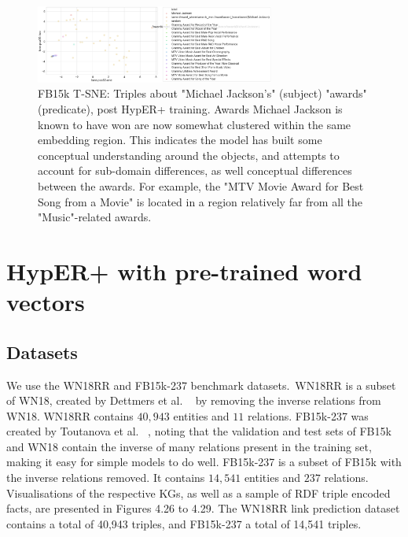 \begin{figure}
   	\centering
    	\includegraphics[width=0.7\textwidth, height=0.3\textheight]{t_sne_test_award}
	\caption{FB15k T-SNE: Triples about "Michael Jackson's" (subject) "awards" (predicate), post HypER+ training. Awards Michael Jackson is known to have won are now somewhat clustered within the same embedding region. This indicates the model has built some conceptual understanding around the objects, and attempts to account for sub-domain differences, as well conceptual differences between the awards. For example, the "MTV Movie Award for Best Song from a Movie" is located in a region relatively far from all the "Music"-related awards.}
\end{figure}



\section{HypER+ with pre-trained word vectors}

\subsection{Datasets} 
We use the WN18RR and FB15k-237 benchmark datasets.\ WN18RR is a subset of WN18, created by Dettmers et al. \unskip~\citep{dettmers2018convolutional} by removing the inverse relations from WN18. WN18RR contains $ 40, 943 $ entities and $ 11 $ relations. FB15k-237 was created by Toutanova et al. \unskip~\citep{toutanova2015observed}, noting that the validation and test sets of FB15k and WN18 contain the inverse of many relations present in the training set, making it easy for simple models to do well. FB15k-237 is a subset of FB15k with the inverse relations removed. It contains $ 14, 541 $ entities and $ 237 $ relations. Visualisations of the respective KGs, as well as a sample of RDF triple encoded facts, are presented in Figures 4.26 to 4.29. The WN18RR link prediction dataset contains a total of 40,943 triples, and FB15k-237 a total of 14,541 triples.

